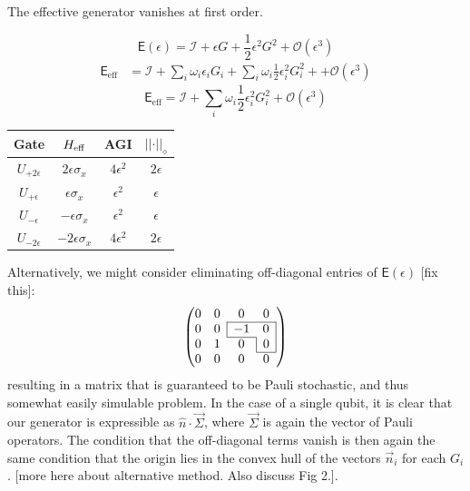 \documentclass[aps,nofootinbib,pra,notitlepage,twocolumn]{revtex4-1}
\newcommand{\note}[1]{{\color{red}[#1]}}
\newcommand{\error}{\ensuremath{{\mathsf{E}}}}
\begin{document}
The effective generator vanishes at first order.

\begin{equation}
	\error(\epsilon) = \mathcal{I} + \epsilon G + \frac{1}{2}\epsilon^2 G^2 + \mathcal{O}(\epsilon^3)
\end{equation}
\begin{align}
	\error_{\text{eff}} 
		&= \mathcal{I} + \sum_i \omega_i \epsilon_i G_i+ \sum_i \omega_i \frac{1}{2}\epsilon^2_i G_i^2 + + \mathcal{O}(\epsilon^3)
\end{align}
\begin{equation}
	\error_{\text{eff}} = \mathcal{I} + \sum_i \omega_i \frac{1}{2}\epsilon^2_i G_i^2 + \mathcal{O}(\epsilon^3)
\end{equation}

\begin{center}
\begin{tabular}{cccc}
	Gate & $H_{\rm{eff}}$ & AGI & $\vert\vert\cdot\vert\vert_\diamond$ \\
\hline
	$U_{+2\epsilon}$ & $2\epsilon \sigma_x$ & $4\epsilon^2$ & $2\epsilon$\\
	$U_{+\epsilon}$ & $\epsilon \sigma_x$ & $\epsilon^2$ & $\epsilon$ \\
	$U_{-\epsilon}$ & $-\epsilon \sigma_x$ & $\epsilon^2$ & $\epsilon$ \\
	$U_{-2\epsilon}$ & $-2\epsilon \sigma_x$ & $4\epsilon^2$ & $2\epsilon$ 
\end{tabular}
\end{center}

Alternatively, we might consider eliminating off-diagonal entries of $\error(\epsilon)$ \note{fix this}:
\begin{equation}
	\left(\begin{array}{@{}ccccc@{}}
		0 & 0 & 0 & 0 \\ 
  		\cline{3-4}
    	0 & 0 & \multicolumn{1}{|c}{-1} & \multicolumn{1}{c|}{0} \\
    	\cline{3-3}		
		0 & 1 & 0 & \multicolumn{1}{|c|}{0}\\
		\cline{4-4}	
		0 & 0 & 0 & 0
	\end{array} 	
	\right)
\end{equation}
 resulting in a matrix that is guaranteed to be Pauli stochastic, and thus somewhat easily simulable problem. In the case of a single qubit, it is clear that our generator is expressible as $\hat{n}\cdot\vec{\Sigma}$, where $\vec{\Sigma}$ is again the vector of Pauli operators. The condition that the off-diagonal terms vanish is then again the same condition that the origin lies in the convex hull of the vectors $\vec{n}_i$ for each $G_i$.
 \note{more here about alternative method. Also discuss Fig 2.}. 
\end{document}
